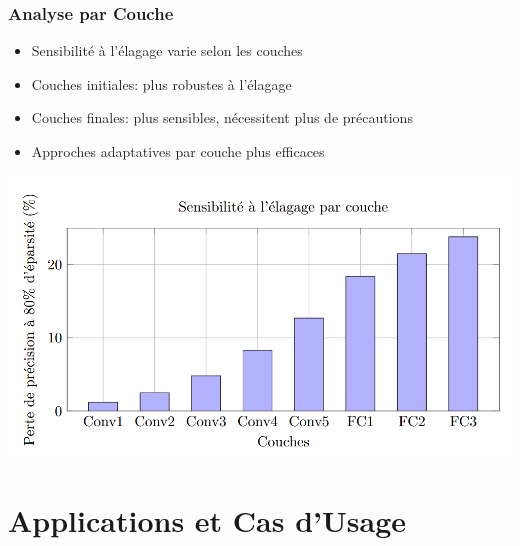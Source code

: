 \documentclass[10pt]{beamer}
\begin{document}
\begin{frame}
\frametitle{Analyse par Couche}
\begin{itemize}
    \item Sensibilité à l'élagage varie selon les couches
    \item Couches initiales: plus robustes à l'élagage
    \item Couches finales: plus sensibles, nécessitent plus de précautions
    \item Approches adaptatives par couche plus efficaces
\end{itemize}

\begin{center}
\includegraphics[width=1\textwidth]{layer_sensitivity.png}
\end{center}
\end{frame}

\section{Applications et Cas d'Usage}
\end{document}
